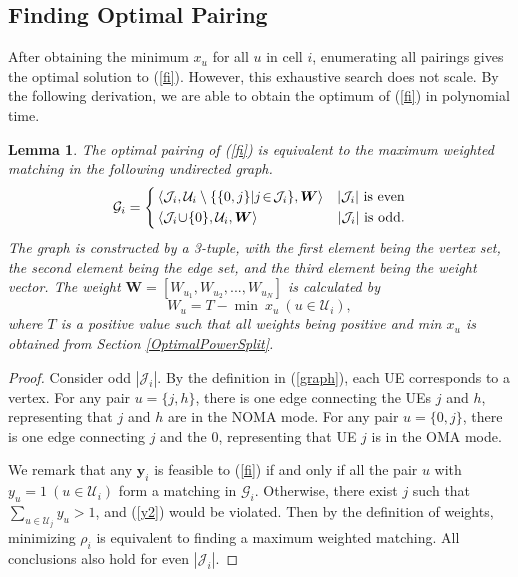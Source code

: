 \documentclass[10pt,journal,final,finalsubmission,twocolumn]{IEEEtran}
\newtheorem{lemma}[theorem]{Lemma}
\begin{document}
 
\subsection{Finding Optimal Pairing}

After obtaining the minimum $x_u$ for all $u$ in cell $i$, enumerating all pairings gives the optimal solution to (\ref{fi}). However, this exhaustive search does not scale. By the following derivation, we are able to obtain the optimum of (\ref{fi}) in polynomial time.

\begin{lemma}
The optimal pairing of (\ref{fi}) is equivalent to the maximum weighted matching in the following undirected graph.
\begin{equation}\label{graph}
\mathcal{G}_i=\left\{
\begin{aligned}
&\left \langle\mathcal{J}_i, \mathcal{U}_i \setminus \{\{0,j\}|j\!\in\!\mathcal{J}_i \}, \boldsymbol{W}\right \rangle&|\mathcal{J}_i|{\rm\ is\ even}\\
&\left \langle\mathcal{J}_i\!\cup\!\{0 \}, \mathcal{U}_i, \boldsymbol{W}\right \rangle&|\mathcal{J}_i|{\rm\ is\ odd}.\end{aligned}
\right.
\end{equation}
The graph is constructed by a 3-tuple, with the first element being the vertex set, the second element being the edge set, and the third element being the weight vector. The weight $\boldsymbol{W} = [W_{u_1},W_{u_2},...,W_{u_N}]$ is calculated by 
\begin{equation}
W_u = T - {\min\ x_u}\ (u\in \mathcal{U}_i),
\end{equation}
where $T$ is a positive value such that all weights being positive and min $ x_u$ is obtained from Section \ref{OptimalPowerSplit}.
\end{lemma}
\begin{proof}
Consider odd $|\mathcal{J}_i|$. By the definition in (\ref{graph}), each UE corresponds to a vertex. For any pair $u = \{j,h\}$, there is one edge connecting the UEs $j$ and $h$, representing that $j$ and $h$ are in the NOMA mode. For any pair $u = \{0,j\}$, there is one edge connecting $j$ and the $0$, representing that UE $j$ is in the OMA mode. 

We remark that any $\boldsymbol{y}_i$ is feasible to (\ref{fi}) if and only if all the pair $u$ with $y_u=1\ (u\in \mathcal{U}_i)$ form a matching in $\mathcal{G}_i$. Otherwise, there exist $j$ such that $\sum_{u\in \mathcal{U}_j}y_u>1$, and (\ref{y2}) would be violated. Then by the definition of weights, minimizing $\rho_i$ is equivalent to finding a maximum weighted matching. All conclusions also hold for even $|\mathcal{J}_i|$.
\end{proof}
\end{document}
